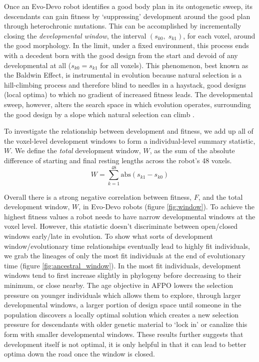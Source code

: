 Once an Evo-Devo robot identifies a good body plan in its ontogenetic sweep, its descendants can gain fitness by `suppressing' development around the good plan through heterochronic mutations.
This can be accomplished by incrementally closing the \textit{developmental window}, the interval $(s_{k0},\; s_{k1})$, for each voxel, around the good morphology.
In the limit, under a fixed environment, this process ends with a decedent born with the good design from the start and devoid of any developmental at all ($s_{k0} = s_{k1}$ for all voxels).
This phenomenon, best known as the Baldwin Effect, is instrumental in evolution
because natural selection is a hill-climbing process and therefore blind to needles in a haystack, good designs (local optima) to which no gradient of increased fitness leads.
The developmental sweep, however, alters the search space in which evolution operates, surrounding the good design
by a slope which natural selection can climb \cite{hinton1987learning}.


To investigate the relationship between development and fitness, we add up all of the voxel-level development windows to form a individual-level summary statistic, $W$. We define the \textit{total} development window, $W$, as the sum of the absolute difference of starting and final resting lengths across the robot's 48 voxels. 
\begin{equation}
W = \sum_{k=1}^{48} \text{abs}(s_{k1}-s_{k0})
\end{equation}

Overall there is a strong negative correlation between fitness, $F$, and the total development window, $W$, in Evo-Devo robots (figure \ref{fig:window}). 
To achieve the highest fitness values a robot needs to have narrow developmental windows at the voxel level.
However, this statistic doesn't discriminate between open/closed windows early/late in evolution. 
To show what sorts of development window/evolutionary time relationships eventually lead to highly fit individuals, we grab the lineages of only the most fit individuals at the end of evolutionary time (figure \ref{fig:ancestral_window}). 
In the most fit individuals, development windows tend to first increase slightly in phylogeny before decreasing to their minimum, or close nearby.
The age objective in AFPO lowers the selection pressure on younger individuals which allows them to explore, through larger developmental windows, a larger portion of design space until someone in the population discovers a locally optimal solution which creates a new selection pressure for descendants with older genetic material to `lock in' or canalize this form with smaller developmental windows.
These results further suggests that development itself is not optimal,
it is only helpful in that it can lead to better optima down the road once the window is closed.








